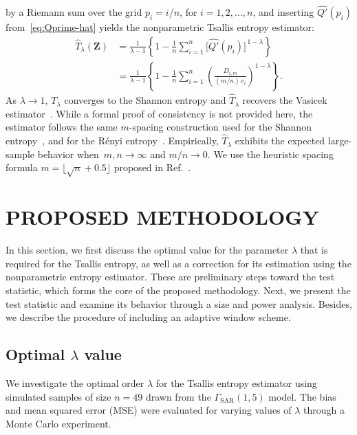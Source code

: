 \documentclass[
  lettersize  journal,
]{IEEEtran}%
\begin{document}
by a Riemann sum over the grid \(p_i=i/n\), for \(i=1,2,\dots, n\), and
inserting \(\widehat{Q'}(p_i)\) from~\eqref{eq:Qprime-hat} yields the
nonparametric Tsallis entropy estimator: \begin{align}
  \widehat T_{\lambda}(\bm{Z})
  &=\frac{1}{\lambda-1}\left\{
1-\frac{1}{n}\sum_{i=1}^{n}\bigl[\widehat{Q'}(p_i)\bigr]^{\,1-\lambda}
\right\} \nonumber\\[4pt]
  &= \frac{1}{\lambda-1}
  \left\{
    1-\frac{1}{n}
       \sum_{i=1}^{n}
       \left(
         \frac{D_{i,m}}{(m/n) \, c_i}
       \right)^{1-\lambda}
  \right\}.
  \label{eq:Tsallis-spacing-estimator}
\end{align} As \(\lambda \to 1\), \(T_\lambda\) converges to the Shannon
entropy and \(\widehat T_{\lambda}\) recovers the Vasicek
estimator~. While a formal proof
of consistency is not provided here, the estimator follows the same
\(m\)-spacing construction used for the Shannon
entropy~,
 and for the Rényi
entropy~. Empirically,
\(\widehat T_\lambda\) exhibits the expected large-sample behavior
when~\(m,n\to\infty\) and \(m/n\to 0\). We use the heuristic spacing
formula \(m = \lfloor \sqrt{n} + 0.5 \rfloor\) proposed in
Ref.~.

\section{PROPOSED METHODOLOGY}\label{sec:met}

In this section, we first discuss the optimal value for the parameter
\(\lambda\) that is required for the Tsallis entropy, as well as a
correction for its estimation using the nonparametric entropy estimator.
These are preliminary steps toward the test statistic, which forms the
core of the proposed methodology. Next, we present the test statistic
and examine its behavior through a size and power analysis. Besides, we
describe the procedure of including an adaptive window scheme.

\subsection{\texorpdfstring{Optimal \(\lambda\)
value}{Optimal \textbackslash lambda value}}\label{sec-lambda}

We investigate the optimal order \(\lambda\) for the Tsallis entropy
estimator using simulated samples of size \(n = 49\) drawn from the
\(\Gamma_{\mathrm{SAR}}(1,5)\) model. The bias and mean squared error
(MSE) were evaluated for varying values of \(\lambda\) through a Monte
Carlo experiment.
\end{document}
